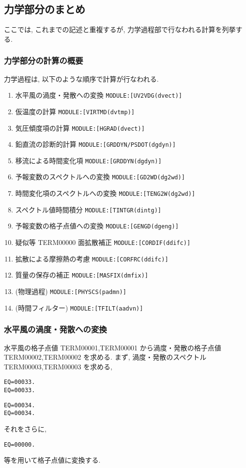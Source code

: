 ﻿
\subsection{力学部分のまとめ}

ここでは, これまでの記述と重複するが,
力学過程部で行なわれる計算を列挙する.

\subsubsection{力学部分の計算の概要}

力学過程は, 以下のような順序で計算が行なわれる.

\begin{enumerate}
\item 水平風の渦度・発散への変換   \texttt{MODULE:[UV2VDG(dvect)]}
\item 仮温度の計算              \texttt{MODULE:[VIRTMD(dvtmp)]}
\item 気圧傾度項の計算           \texttt{MODULE:[HGRAD(dvect)]}
\item 鉛直流の診断的計算         \texttt{MODULE:[GRDDYN/PSDOT(dgdyn)]}
\item 移流による時間変化項 \texttt{MODULE:[GRDDYN(dgdyn)]}
\item 予報変数のスペクトルへの変換 \texttt{MODULE:[GD2WD(dg2wd)]}
\item 時間変化項のスペクトルへの変換 \texttt{MODULE:[TENG2W(dg2wd)]}
\item スペクトル値時間積分 \texttt{MODULE:[TINTGR(dintg)]}
\item 予報変数の格子点値への変換 \texttt{MODULE:[GENGD(dgeng)]}
\item 疑似等 TERM00000 面拡散補正   \texttt{MODULE:[CORDIF(ddifc)]}
\item 拡散による摩擦熱の考慮    \texttt{MODULE:[CORFRC(ddifc)]}
\item 質量の保存の補正          \texttt{MODULE:[MASFIX(dmfix)]}
\item (物理過程)             \texttt{MODULE:[PHYSCS(padmn)]}
\item (時間フィルター)        \texttt{MODULE:[TFILT(aadvn)]}
\end{enumerate}

\subsubsection{水平風の渦度・発散への変換}

水平風の格子点値 TERM00001,TERM00001 
から渦度・発散の格子点値 TERM00002,TERM00002 を求める.
まず, 渦度・発散のスペクトル
TERM00003,TERM00003 を求める,
\begin{verbatim}
EQ=00033.
EQ=00033.
\end{verbatim}
\begin{verbatim}
EQ=00034.
EQ=00034.
\end{verbatim}
それをさらに, 
\begin{verbatim}
EQ=00000.
\end{verbatim}
等を用いて格子点値に変換する.

